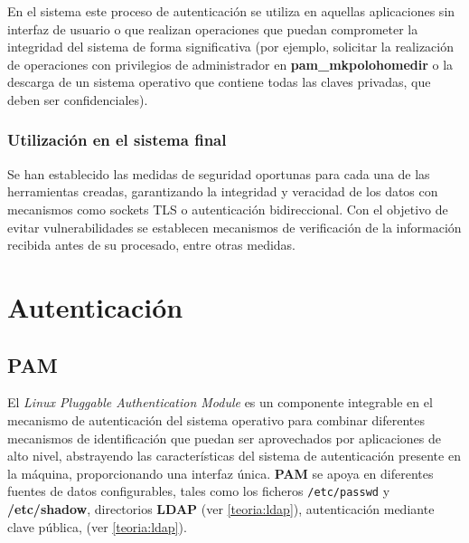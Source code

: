 En el sistema este proceso de autenticación se utiliza en aquellas aplicaciones sin interfaz de usuario o que realizan operaciones que puedan comprometer la integridad del sistema de forma significativa (por ejemplo, solicitar la realización de operaciones con privilegios de administrador en \textbf{pam\_mkpolohomedir} o la descarga de un sistema operativo que contiene todas las claves privadas, que deben ser confidenciales).

\subsubsection{Utilización en el sistema final}

Se han establecido las medidas de seguridad oportunas para cada una de las herramientas creadas, garantizando la integridad y veracidad de los datos con mecanismos como sockets TLS o autenticación bidireccional. Con el objetivo de evitar vulnerabilidades se establecen mecanismos de verificación de la información recibida antes de su procesado, entre otras medidas.


\section{Autenticación}
\subsection{PAM}

El \textit{Linux Pluggable Authentication Module}\cite{opengroup:rfc86.0} es un componente integrable en el mecanismo de autenticación del sistema operativo para combinar diferentes mecanismos de identificación que puedan ser aprovechados por aplicaciones de alto nivel, abstrayendo las características del sistema de autenticación presente en la máquina, proporcionando una interfaz única. \textbf{PAM} se apoya en diferentes fuentes de datos configurables, tales como los ficheros \texttt{/etc/passwd} y \textbf{/etc/shadow}, directorios \textbf{LDAP} (ver \ref{teoria:ldap}), autenticación mediante clave pública, (ver \ref{teoria:ldap}).

